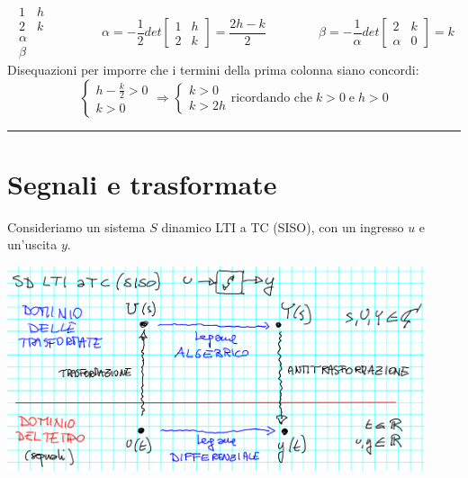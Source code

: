 \[
    \begin{matrix}
        1&h\\
        2&k\\
        \alpha\\
        \beta
    \end{matrix} \;\;\;\;\;\;\;\;\;\;\;\;\;\;\;\alpha = - \frac{1}{2}det \left[\begin{matrix}
        1&h\\2&k
    \end{matrix}\right] = \frac{2h-k}{2} \;\;\;\;\;\;\;\;\;\;\;\;\;\;\; \beta = - \frac{1}{\alpha} det \left[\begin{matrix}
        2 & k \\ \alpha & 0
    \end{matrix}\right] = k
\]
Disequazioni per imporre che i termini della prima colonna siano concordi:
\[
    \begin{cases}
        h - \frac{k}{2}>0\\
        k>0
    \end{cases} \Rightarrow \begin{cases}
        k>0\\
        k>2h
    \end{cases} \text{ricordando che} \; k>0 \;\text{e}\;h>0
\]
\rule{\textwidth}{0,4pt}
\newpage
\section{Segnali e trasformate}
Consideriamo un sistema $S$ dinamico LTI a TC (SISO), con un ingresso $u$ e un'uscita $y$.\newline
{}
\begin{center}
    \includegraphics[height=6cm]{../lezione5/img1.PNG}
\end{center}

